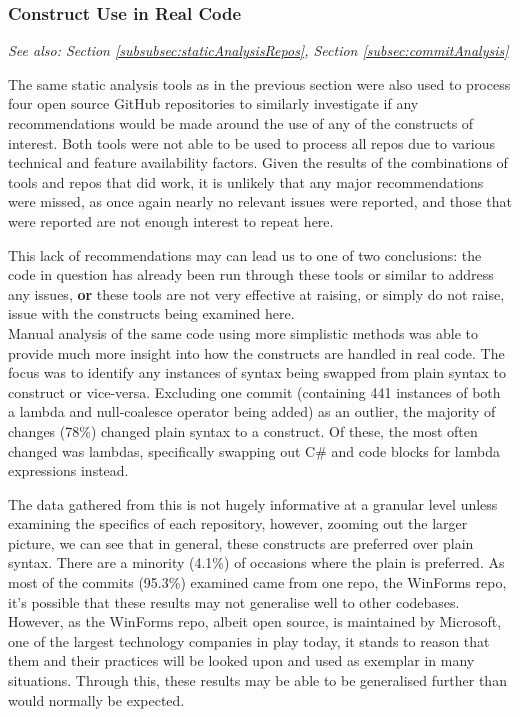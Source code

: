 \documentclass{article}
\begin{document}
        \subsubsection{Construct Use in Real Code}
            \textit{See also: Section \ref{subsubsec:staticAnalysisRepos}, Section \ref{subsec:commitAnalysis}}
            \newline

            \noindent The same static analysis tools as in the previous section were also used to process four open source GitHub repositories to similarly investigate if any recommendations would be made around the use of any of the constructs of interest. Both tools were not able to be used to process all repos due to various technical and feature availability factors. Given the results of the combinations of tools and repos that did work, it is unlikely that any major recommendations were missed, as once again nearly no relevant issues were reported, and those that were reported are not enough interest to repeat here.
            
            This lack of recommendations may can lead us to one of two conclusions: the code in question has already been run through these tools or similar to address any issues, \textbf{or} these tools are not very effective at raising, or simply do not raise, issue with the constructs being examined here.
            \\

            Manual analysis of the same code using more simplistic methods was able to provide much more insight into how the constructs are handled in real code. The focus was to identify any instances of syntax being swapped from plain syntax to construct or vice-versa. Excluding one commit (containing 441 instances of both a lambda and null-coalesce operator being added) as an outlier, the majority of changes (78\%) changed plain syntax to a construct. Of these, the most often changed was lambdas, specifically swapping out C\#  and  code blocks for lambda expressions instead.

            The data gathered from this is not hugely informative at a granular level unless examining the specifics of each repository, however, zooming out the larger picture, we can see that in general, these constructs are preferred over plain syntax. There are a minority (4.1\%) of occasions where the plain is preferred. As most of the commits (95.3\%) examined came from one repo, the WinForms repo, it's possible that these results may not generalise well to other codebases. However, as the WinForms repo, albeit open source, is maintained by Microsoft, one of the largest technology companies in play today, it stands to reason that them and their practices will be looked upon and used as exemplar in many situations. Through this, these results may be able to be generalised further than would normally be expected.
\end{document}

